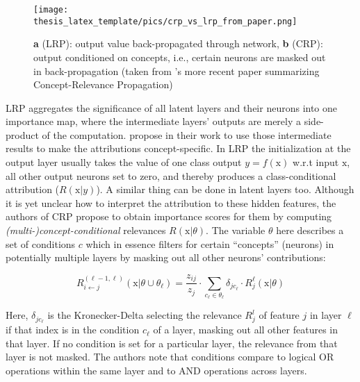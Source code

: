 \begin{figure}[t!]
    \centering
    \texttt{[image: thesis\_latex\_template/pics/crp\_vs\_lrp\_from\_paper.png]}
    \caption[CRP vs. LRP]{\textbf{a} (LRP): output value back-propagated through network, \textbf{b} (CRP): output conditioned on concepts, i.e., certain neurons are masked out in back-propagation (taken from \cite{Achtibat2023}'s more recent paper summarizing Concept-Relevance Propagation)}
    \label{fig:crp_vs_lrp}
\end{figure}

LRP aggregates the significance of all latent layers and their neurons into one importance map, where the intermediate layers' outputs are merely a side-product of the computation.
\cite{Achtibat2022} propose in their work to use those intermediate results to make the attributions concept-specific. In LRP the initialization at the output layer usually takes the value of one class output $y= f(\mathrm{x})$ w.r.t input $\mathrm{x}$, all other output neurons set to zero, and thereby produces a class-conditional attribution ($R(\mathrm{x}|y)$). A similar thing can be done in latent layers too. Although it is yet unclear how to interpret the attribution to these hidden features, the authors of CRP propose to obtain importance scores for them by computing \textit{(multi-)concept-conditional} relevances $R(\mathrm{x}|\theta)$. The variable $\theta$ here describes a set of conditions $c$ which in essence filters for certain ``concepts'' (neurons) in potentially multiple layers by masking out all other neurons' contributions:

\begin{equation}\displaystyle
    R^{(\ell-1, \ell)}_{i \leftarrow j} (\mathrm{x} | \theta \cup \theta_{\ell}) = \frac{z_{ij}}{z_j} \cdot \sum_{c_{\ell} \in \theta_{\ell}} \delta_{jc_{\ell}} \cdot R^{\ell}_j (\mathrm{x} | \theta )
\end{equation}

Here, $\delta_{jc_{\ell}}$ is the Kronecker-Delta selecting the relevance $R^l_j$ of feature $j$ in layer $\ell$ if that index is in the condition $c_{\ell}$ of a layer, masking out all other features in that layer. If no condition is set for a particular layer, the relevance from that layer is not masked. The authors note that conditions compare to logical OR operations within the same layer and to AND operations across layers. 

